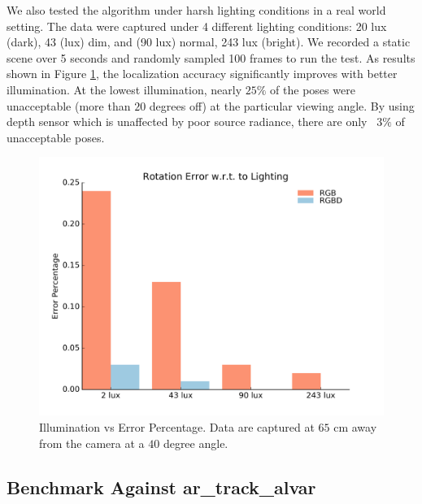 We also tested the algorithm under harsh lighting conditions in a real world setting. The data were captured under 4 different lighting conditions: 20 lux (dark), 43 (lux) dim, and (90 lux) normal, 243 lux (bright). We recorded a static scene over 5 seconds and randomly sampled 100 frames to run the test.  As results shown in Figure \ref{fig:lighting_result}, the localization accuracy significantly improves with better illumination. At the lowest illumination, nearly $25\%$ of the poses were unacceptable (more than $20$ degrees off) at the particular viewing angle. By using depth sensor which is unaffected by poor source radiance, there are only ~$3\%$ of unacceptable poses.

\begin{figure}
\centering
\includegraphics[width=\columnwidth]{figs/lighting_fig1}
\caption{Illumination vs Error Percentage. Data are captured at $65$ cm away from the camera at a $40$ degree angle.}
\label{fig:lighting_result}
\end{figure}


\subsection{Benchmark Against ar\_track\_alvar}

